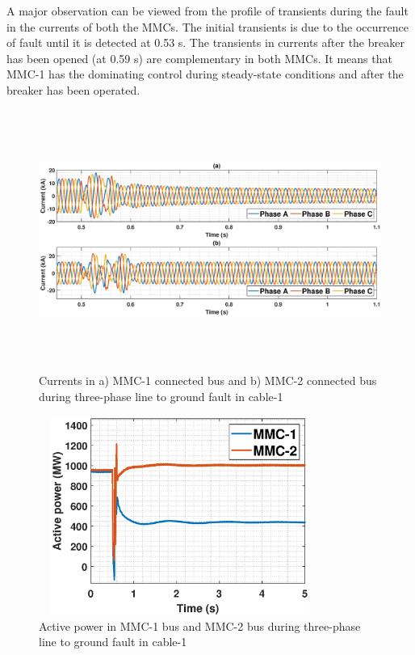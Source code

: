 A major observation can be viewed from the profile of transients during the fault in the currents of both the \gls{MMC}s. The initial transients is due to the occurrence of fault until it is detected at 0.53 s. The transients in currents after the breaker has been opened (at 0.59 s) are complementary in both \gls{MMC}s. It means that \gls{MMC}-1 has the dominating control during steady-state conditions and after the breaker has been operated. 

\begin{figure}[H]
\hspace*{-1.2cm}
    \includegraphics[height = 8.5cm,width = 18.5cm]{Diagrams/Chapter_5/IABC_MMC_1_2_3phaseSC.eps}
    \caption{Currents in a) MMC-1 connected bus and b) MMC-2 connected bus during three-phase line to ground fault in cable-1}
    \label{1516_3phaseSC}
\end{figure}

\begin{figure}[H]
\centering
    \includegraphics[height = 6.5cm,width = 9.25cm]{Diagrams/Chapter_5/P_MMC_1_2_3phaseSC.eps}
    \caption{Active power in MMC-1 bus and MMC-2 bus during three-phase line to ground fault in cable-1}
    \label{17_3phaseSC}
\end{figure}

